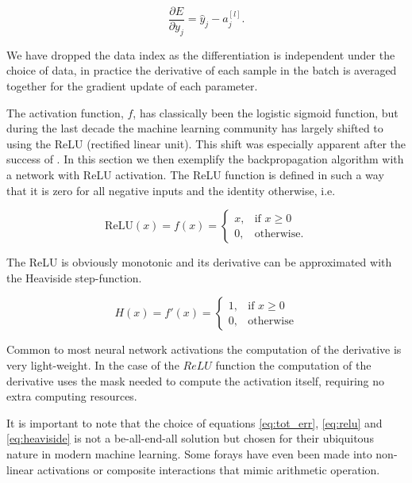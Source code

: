 \begin{equation}\label{eq:err_grad}
	\frac{\partial E}{\partial y_{j}} = \hat{y}_{j} - a^{[l]}_j.
\end{equation}

\noindent We have dropped the data index as the differentiation is independent under the choice of data, in practice the derivative of each sample in the batch is averaged together for the gradient update of each parameter. 

The activation function, $f$, has classically been the logistic sigmoid function, but during the last decade the machine learning community has largely shifted to using the ReLU (rectified linear unit). This shift was especially apparent after the success of \citet{Krizhevsky2012}. In this section we then exemplify the backpropagation algorithm with a network with ReLU activation. The ReLU function is defined in such a way that it is zero for all negative inputs and the identity otherwise, i.e. 

\begin{equation}\label{eq:relu}
	\text{ReLU} (x) = f(x) = \begin{cases}
	x, & \text{if } x \geq 0 \\
	0,  & \text{otherwise} .
	\end{cases}
\end{equation}

\noindent The ReLU is obviously monotonic and its derivative can be approximated with the Heaviside step-function. 

\begin{equation}\label{eq:heaviside}
H(x) = f'(x) = 	\begin{cases}1, & \text{if } x \geq 0 \\
	0,  & \text{otherwise}
\end{cases}
\end{equation}

\noindent Common to most neural network activations the computation of the derivative is very light-weight. In the case of the $ReLU$ function the computation of the derivative uses the mask needed to compute the activation itself, requiring no extra computing resources. 

It is important to note that the choice of equations \ref{eq:tot_err}, \ref{eq:relu} and \ref{eq:heaviside} is not a be-all-end-all solution but chosen for their ubiquitous nature in modern machine learning. Some forays have even been made into non-linear activations or composite interactions that mimic arithmetic operation. 

